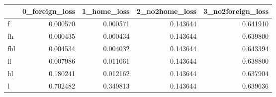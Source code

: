 \begin{tabular}{lrrrr}
\toprule
 & 0_foreign_loss & 1_home_loss & 2_no2home_loss & 3_no2foreign_loss \\
\midrule
f & 0.000570 & 0.000571 & 0.143644 & 0.641910 \\
fh & 0.000435 & 0.000434 & 0.143644 & 0.639800 \\
fhl & 0.004534 & 0.004032 & 0.143644 & 0.643394 \\
fl & 0.007986 & 0.011061 & 0.143644 & 0.638800 \\
hl & 0.180241 & 0.012162 & 0.143644 & 0.637904 \\
l & 0.702482 & 0.349813 & 0.143644 & 0.639636 \\
\bottomrule
\end{tabular}
